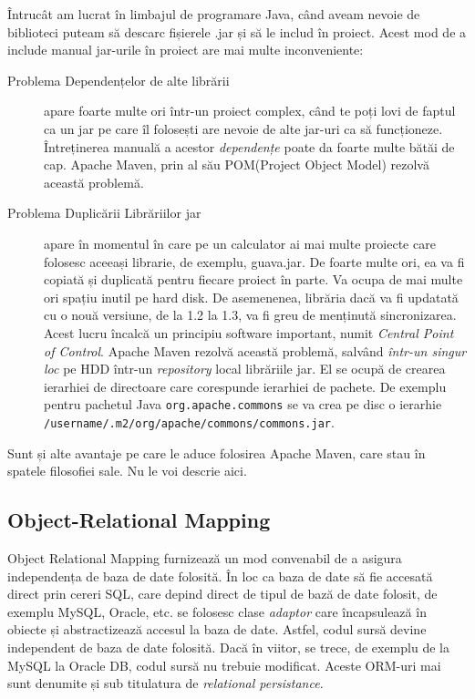 
Întrucât am lucrat în limbajul de programare Java, când aveam nevoie de biblioteci puteam să descarc fișierele .jar și să le includ în proiect. Acest mod de a include manual jar-urile în proiect are mai multe inconveniente:


\begin{description}
\item[Problema Dependențelor de alte librării] apare foarte multe ori într-un proiect complex, când te poți lovi de faptul ca un jar pe care îl folosești are nevoie de alte jar-uri ca să funcționeze. Întreținerea manuală a acestor \textit{dependențe} poate da foarte multe bătăi de cap. Apache Maven, prin al său POM(Project Object Model) rezolvă această problemă.

\item[Problema Duplicării Librăriilor jar] apare în momentul în care pe un calculator ai mai multe proiecte care folosesc aceeași librarie, de exemplu, guava.jar. De foarte multe ori, ea va fi copiată și duplicată pentru fiecare proiect în parte. Va ocupa de mai multe ori spațiu inutil pe hard disk. De asemenenea, librăria dacă va fi updatată cu o nouă versiune, de la 1.2 la 1.3, va fi greu de menținută sincronizarea. Acest lucru încalcă un principiu software important, numit \textit{Central Point of Control}. Apache Maven rezolvă această problemă, salvând \textit{într-un singur loc} pe HDD într-un \textit{repository} local librăriile jar. El se ocupă de crearea ierarhiei de directoare care corespunde ierarhiei de pachete. De exemplu pentru pachetul Java \texttt{org.apache.commons} se va crea pe disc o ierarhie \texttt{/username/.m2/org/apache/commons/commons.jar}.
\end{description}

Sunt și alte avantaje pe care le aduce folosirea Apache Maven, care stau în spatele filosofiei sale. Nu le voi descrie aici.

\subsection{Object-Relational Mapping}



Object Relational Mapping furnizează un mod convenabil de a asigura independența de baza de date folosită. În loc ca baza de date să fie accesată direct prin cereri SQL, care depind direct de tipul de bază de date folosit, de exemplu MySQL, Oracle, etc. se folosesc clase \textit{adaptor} care încapsulează în obiecte și abstractizează accesul la baza de date. Astfel, codul sursă devine independent de baza de date folosită. Dacă în viitor, se trece, de exemplu de la MySQL la Oracle DB, codul sursă nu trebuie modificat. Aceste ORM-uri mai sunt denumite și sub titulatura de \textit{relational persistance}.


